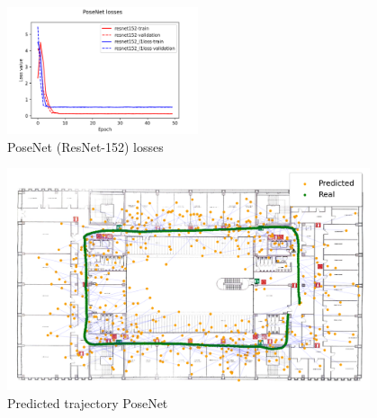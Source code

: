 \begin{figure}[h]
    \begin{center}
        \includegraphics[width=0.50\textwidth]{./imgs/posenet_losses.png}
    \end{center}
    \caption{PoseNet (ResNet-152) losses}
    \label{fig:posenet-losses}
\end{figure}

\begin{figure}[h]
    \begin{center}
        \includegraphics[width=0.95\textwidth]{./imgs/posenet_map.png}
    \end{center}
    \caption{Predicted trajectory PoseNet}
    \label{fig:trajectory-posenet}
\end{figure}



